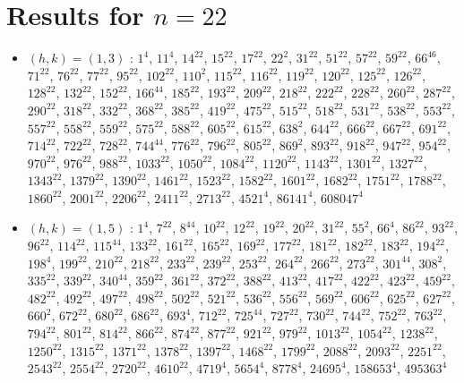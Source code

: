 \section{Results for $n=22$}
\begin{itemize}
\item $(h,k)=(1,3)$ : $1^{4}$, $11^{4}$, $14^{22}$, $15^{22}$, $17^{22}$, $22^{2}$, $31^{22}$, $51^{22}$, $57^{22}$, $59^{22}$, $66^{46}$, $71^{22}$, $76^{22}$, $77^{22}$, $95^{22}$, $102^{22}$, $110^{2}$, $115^{22}$, $116^{22}$, $119^{22}$, $120^{22}$, $125^{22}$, $126^{22}$, $128^{22}$, $132^{22}$, $152^{22}$, $166^{44}$, $185^{22}$, $193^{22}$, $209^{22}$, $218^{22}$, $222^{22}$, $228^{22}$, $260^{22}$, $287^{22}$, $290^{22}$, $318^{22}$, $332^{22}$, $368^{22}$, $385^{22}$, $419^{22}$, $475^{22}$, $515^{22}$, $518^{22}$, $531^{22}$, $538^{22}$, $553^{22}$, $557^{22}$, $558^{22}$, $559^{22}$, $575^{22}$, $588^{22}$, $605^{22}$, $615^{22}$, $638^{2}$, $644^{22}$, $666^{22}$, $667^{22}$, $691^{22}$, $714^{22}$, $722^{22}$, $728^{22}$, $744^{44}$, $776^{22}$, $796^{22}$, $805^{22}$, $869^{2}$, $893^{22}$, $918^{22}$, $947^{22}$, $954^{22}$, $970^{22}$, $976^{22}$, $988^{22}$, $1033^{22}$, $1050^{22}$, $1084^{22}$, $1120^{22}$, $1143^{22}$, $1301^{22}$, $1327^{22}$, $1343^{22}$, $1379^{22}$, $1390^{22}$, $1461^{22}$, $1523^{22}$, $1582^{22}$, $1601^{22}$, $1682^{22}$, $1751^{22}$, $1788^{22}$, $1860^{22}$, $2001^{22}$, $2206^{22}$, $2411^{22}$, $2713^{22}$, $4521^{4}$, $86141^{4}$, $608047^{4}$
\item $(h,k)=(1,5)$ : $1^{4}$, $7^{22}$, $8^{44}$, $10^{22}$, $12^{22}$, $19^{22}$, $20^{22}$, $31^{22}$, $55^{2}$, $66^{4}$, $86^{22}$, $93^{22}$, $96^{22}$, $114^{22}$, $115^{44}$, $133^{22}$, $161^{22}$, $165^{22}$, $169^{22}$, $177^{22}$, $181^{22}$, $182^{22}$, $183^{22}$, $194^{22}$, $198^{4}$, $199^{22}$, $210^{22}$, $218^{22}$, $233^{22}$, $239^{22}$, $253^{22}$, $264^{22}$, $266^{22}$, $273^{22}$, $301^{44}$, $308^{2}$, $335^{22}$, $339^{22}$, $340^{44}$, $359^{22}$, $361^{22}$, $372^{22}$, $388^{22}$, $413^{22}$, $417^{22}$, $422^{22}$, $423^{22}$, $459^{22}$, $482^{22}$, $492^{22}$, $497^{22}$, $498^{22}$, $502^{22}$, $521^{22}$, $536^{22}$, $556^{22}$, $569^{22}$, $606^{22}$, $625^{22}$, $627^{22}$, $660^{2}$, $672^{22}$, $680^{22}$, $686^{22}$, $693^{4}$, $712^{22}$, $725^{44}$, $727^{22}$, $730^{22}$, $744^{22}$, $752^{22}$, $763^{22}$, $794^{22}$, $801^{22}$, $814^{22}$, $866^{22}$, $874^{22}$, $877^{22}$, $921^{22}$, $979^{22}$, $1013^{22}$, $1054^{22}$, $1238^{22}$, $1250^{22}$, $1315^{22}$, $1371^{22}$, $1378^{22}$, $1397^{22}$, $1468^{22}$, $1799^{22}$, $2088^{22}$, $2093^{22}$, $2251^{22}$, $2543^{22}$, $2554^{22}$, $2720^{22}$, $4610^{22}$, $4719^{4}$, $5654^{4}$, $8778^{4}$, $24695^{4}$, $158653^{4}$, $495363^{4}$

\end{itemize}
